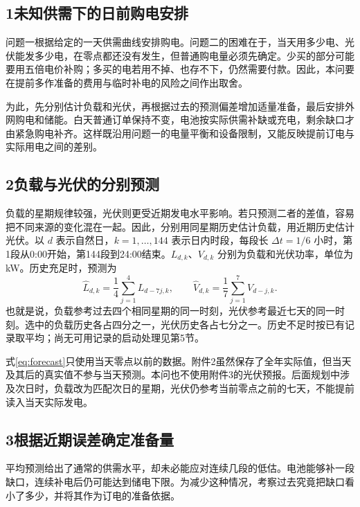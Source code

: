 \subsection*{1\quad 未知供需下的日前购电安排}

问题一根据给定的一天供需曲线安排购电。问题二的困难在于，当天用多少电、光伏能发多少电，在零点都还没有发生，但普通购电量必须先确定。少买的部分可能要用五倍电价补购；多买的电若用不掉、也存不下，仍然需要付款。因此，本问要在提前多作准备的费用与临时补电的风险之间作出取舍。

为此，先分别估计负载和光伏，再根据过去的预测偏差增加适量准备，最后安排外网购电和储能。白天普通订单保持不变，电池按实际供需补缺或充电，剩余缺口才由紧急购电补齐。这样既沿用问题一的电量平衡和设备限制，又能反映提前订电与实际用电之间的差别。

\subsection*{2\quad 负载与光伏的分别预测}

负载的星期规律较强，光伏则更受近期发电水平影响。若只预测二者的差值，容易把不同来源的变化混在一起。因此，分别用同星期历史估计负载，用近期历史估计光伏。以 $d$ 表示自然日，$k=1,\ldots,144$ 表示日内时段，每段长 $\Delta t=1/6$ 小时，第1段从0:00开始，第144段到24:00结束。$L_{d,k}$、$V_{d,k}$ 分别为负载和光伏功率，单位为 kW。历史充足时，预测为
\begin{equation}
\widehat L_{d,k}=\frac14\sum_{j=1}^{4}L_{d-7j,k},\qquad
\widehat V_{d,k}=\frac17\sum_{j=1}^{7}V_{d-j,k}.
\label{eq:forecast}
\end{equation}
也就是说，负载参考过去四个相同星期的同一时刻，光伏参考最近七天的同一时刻。选中的负载历史各占四分之一，光伏历史各占七分之一。历史不足时按已有记录取平均；尚无可用记录的启动处理见第5节。

式\eqref{eq:forecast}只使用当天零点以前的数据。附件2虽然保存了全年实际值，但当天及其后的真实值不参与当天预测。本问也不使用附件3的光伏预报。后面规划中涉及次日时，负载改为匹配次日的星期，光伏仍参考当前零点之前的七天，不能提前读入当天实际发电。

\subsection*{3\quad 根据近期误差确定准备量}

平均预测给出了通常的供需水平，却未必能应对连续几段的低估。电池能够补一段缺口，连续补电后仍可能达到储电下限。为减少这种情况，考察过去究竟把缺口看小了多少，并将其作为订电的准备依据。

